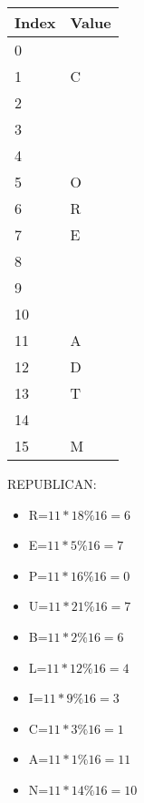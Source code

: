 \documentclass{article}
\begin{document}
\begin{table}[H]
\centering
\begin{tabular}{|l|l|}
\hline
\rowcolor[HTML]{C0C0C0} 
Index    & Value \\ \hline
0        &      \\ \hline
1        & C     \\ \hline
2        &      \\ \hline
3        &      \\ \hline
4        &      \\ \hline
5        & O     \\ \hline
6        & R     \\ \hline
7        & E     \\ \hline
8        &      \\ \hline
9        &      \\ \hline
10       &      \\ \hline
11       & A     \\ \hline
12       & D     \\ \hline
13       & T     \\ \hline
14       &      \\ \hline
15       & M     \\ \hline
\end{tabular}
\end{table}
REPUBLICAN:
\begin{itemize}
  \item R=\( 11*18\%16=6 \)
  \item E=\( 11*5\%16=7 \)
  \item P=\( 11*16\%16=0 \)
  \item U=\( 11*21\%16=7 \)
  \item B=\( 11*2\%16=6 \)
  \item L=\( 11*12\%16=4 \)
  \item I=\( 11*9\%16=3 \)
  \item C=\( 11*3\%16=1 \)
  \item A=\( 11*1\%16=11 \)
  \item N=\( 11*14\%16=10 \)
\end{itemize}
\end{document}
